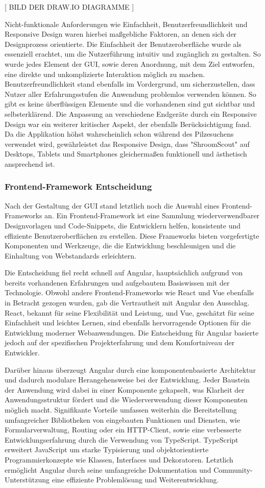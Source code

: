\documentclass[../main.tex]{subfiles}
\begin{document}
[ BILD DER DRAW.IO DIAGRAMME ]

Nicht-funktionale Anforderungen wie Einfachheit, Benutzerfreundlichkeit und Responsive Design waren hierbei maßgebliche 
Faktoren, an denen sich der Designprozess orientierte. Die Einfachheit der Benutzeroberfläche wurde als essenziell erachtet, 
um die Nutzerführung intuitiv und zugänglich zu gestalten. So wurde jedes Element der GUI, sowie deren Anordnung, mit dem Ziel 
entworfen, eine direkte und unkomplizierte Interaktion möglich zu machen. Benutzerfreundlichkeit stand ebenfalls im Vordergrund, 
um sicherzustellen, dass Nutzer aller Erfahrungsstufen die Anwendung problemlos verwenden können. So gibt es keine überflüssigen
Elemente und die vorhandenen sind gut sichtbar und selbsterklärend. Die Anpassung an verschiedene Endgeräte durch ein Responsive 
Design war ein weiterer kritischer Aspekt, der ebenfalls Berücksichtigung fand. Da die Applikation höhst wahrscheinlich schon 
während des Pilzesuchens verwendet wird, gewährleistet das Responsive Design, dass "ShroomScout" auf Desktops, Tablets und 
Smartphones gleichermaßen funktionell und ästhetisch ansprechend ist.

\subsubsection{Frontend-Framework Entscheidung}
Nach der Gestaltung der GUI stand letztlich noch die Auswahl eines Frontend-Frameworks an. Ein Frontend-Framework ist eine Sammlung 
wiederverwendbarer Designvorlagen und Code-Snippets, die Entwicklern helfen, konsistente und effiziente Benutzeroberflächen 
zu erstellen. Diese Frameworks bieten vorgefertigte Komponenten und Werkzeuge, die die Entwicklung beschleunigen und die 
Einhaltung von Webstandards erleichtern.

Die Entscheidung fiel recht schnell auf Angular, hauptsächlich aufgrund von bereits vorhandenen Erfahrungen und aufgebautem
Basiswissen mit der Technologie. Obwohl andere Frontend-Frameworks wie React und Vue ebenfalls in Betracht gezogen wurden, 
gab die Vertrautheit mit Angular den Ausschlag. React, bekannt für seine Flexibilität und Leistung, und Vue, geschätzt für 
seine Einfachheit und leichtes Lernen, sind ebenfalls hervorragende Optionen für die Entwicklung moderner Webanwendungen. Die 
Entscheidung für Angular basierte jedoch auf der spezifischen Projekterfahrung und dem Komfortniveau der Entwickler. 

Darüber hinaus überzeugt Angular durch eine komponentenbasierte Architektur und dadurch modulare Herangehensweise bei der Entwicklung.
Jeder Baustein der Anwendung wird dabei in einer Komponente gekapselt, was Klarheit der Anwendungsstruktur fördert und die Wiederverwendung
dieser Komponenten möglich macht. Signifikante Vorteile umfassen weiterhin die Bereitstellung umfangreicher Bibliotheken von eingebauten 
Funktionen und Diensten, wie Formularverwaltung, Routing oder ein HTTP-Client, sowie eine verbesserte Entwicklungserfahrung durch die 
Verwendung von TypeScript. TypeScript erweitert JavaScript um starke Typisierung und objektorientierte Programmierkonzepte wie Klassen, 
Interfaces und Dekoratoren. Letztlich ermöglicht Angular durch seine umfangreiche Dokumentation und Community-Unterstützung eine effiziente 
Problemlösung und Weiterentwicklung.
\end{document}
